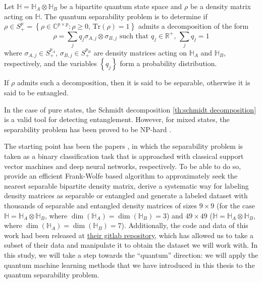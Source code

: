 \begin{tcolorbox}[title=Quantum separability problem]

    Let $\mathbb{H} = \mathbb{H}_A \otimes \mathbb{H}_B$ be a bipartite quantum state space and $\rho$ be a density matrix acting on $\mathbb{H}$. The quantum separability problem is to determine if ${\rho \in S_{+}^{p} = \left \lbrace \rho \in \mathbb{C}^{p \times p}: \rho \geq 0,\, \mathrm{Tr}(\rho)=1  \right\rbrace}$ admits a decomposition of the form
    \begin{equation}
        \rho = \sum_{j}q_j \sigma_{A,j} \otimes \sigma_{B,j} \text{ such that } q_j\in \mathbb{R}^{+},\, \sum_{j}q_j =1
    \end{equation}
    where $\sigma_{A,j} \in S_{+}^{p_A}$, $\sigma_{B,j} \in S_{+}^{p_B}$ are density matrices acting on $\mathbb{H}_A$ and $\mathbb{H}_B$, respectively, and the variables $\left\lbrace q_j \right\rbrace$ form a probability distribution.

    If $\rho$ admits such a decomposition, then it is said to be separable, otherwise it is said to be entangled.
\end{tcolorbox}



In the case of pure states, the Schmidt decomposition \autoref{th:schmidt decomposition} is a valid tool for detecting entanglement. However, for mixed states, the separability problem has been proved to be NP-hard \cite{gurvits2003classical}. 

The starting point has been the papers \cite{casale2023large, urena2023entanglement}, in which the separability problem is taken as a binary classification task that is approached with classical support vector machines and deep neural networks, respectively. To be able to do so, \cite{casale2023large} provide an efficient Frank-Wolfe based algorithm to approximately seek the nearest separable bipartite density matrix, derive a systematic way for labeling density matrices as separable or entangled and generate a labeled dataset with thousands of separable and entangled density matrices of sizes $9 \times 9$ (for the case $\mathbb{H}=\mathbb{H}_A \otimes \mathbb{H}_B$, where $\dim (\mathbb{H}_A )= \dim (\mathbb{H}_B ) = 3 $) and $49 \times 49$ ($\mathbb{H}=\mathbb{H}_A \otimes \mathbb{H}_B$, where $\dim (\mathbb{H}_A )= \dim (\mathbb{H}_B ) = 7 $). Additionally, the code and data of this work had been released at \href{https://gitlab.lis-lab.fr/balthazar.casale/ML-Quant-Sep}{their gitlab repository}, which has allowed us to take a subset of their data and manipulate it to obtain the dataset we will work with. In this study, we will take a step towards the ``quantum'' direction: we will apply the quantum machine learning methods that we have introduced in this thesis to the quantum separability problem. 

